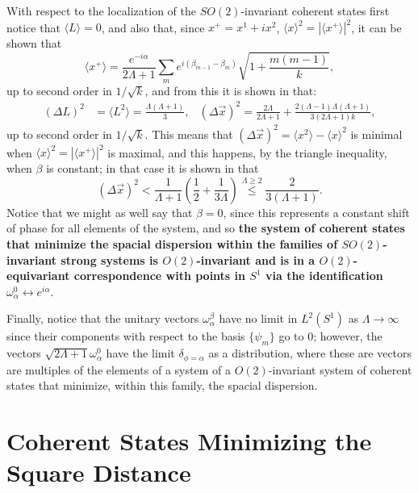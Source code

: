With respect to the localization of the $SO(2)$-invariant coherent states first notice that $\langle L \rangle = 0$, and also that, since $x^+ = x^1 + i x^2$, $\langle x\rangle ^2 = |\langle x^+ \rangle|^2$, it can be shown that 
\begin{equation*}
    \langle x^+ \rangle = \frac{e^{-i\alpha}}{2\Lambda + 1} \sum_{m} e^{i( \beta_{m-1} - \beta_m)} \sqrt{1 + \frac{m(m-1)}{k}},
\end{equation*} 
up to second order in $1/\sqrt{k}$, and from this it is shown in \cite{FioreCoherent2020} that:
\begin{align}\label{equationLocalizationAllStrongSystemsCoherentD2}
    (\Delta L)^2 &= \langle L^2 \rangle = \frac{\Lambda(\Lambda + 1)}{3},&
    (\Delta \vec x)^2 = \frac{2 \Lambda}{2 \Lambda + 1} + \frac{2(\Lambda - 1)\Lambda (\Lambda + 1)}{3(2\Lambda + 1)k},
\end{align}
up to second order in $1/\sqrt{k}$. This means that $(\Delta \vec x)^2 = \langle x^2 \rangle - \langle x \rangle ^2$ is minimal when $\langle x \rangle ^2 = |\langle x^+ \rangle |^2$ is maximal, and this happens, by the triangle inequality, when $\beta$ is constant; in that case it is shown in \cite{FioreCoherent2020} that
\begin{equation}
    (\Delta \vec x)^2 < \frac{1}{\Lambda + 1} \left( \frac{1}{2} + \frac{1}{3\Lambda} \right) \overset{\Lambda \geq 2}{\leq } \frac{2}{3(\Lambda + 1)}.
\end{equation}
Notice that we might as well say that $\beta = 0$, since this represents a constant shift of phase for all elements of the system, and so \textbf{the system of coherent states that minimize the spacial dispersion within the families of $SO(2)$-invariant strong systems is $O(2)$-invariant and is in a $O(2)$-equivariant correspondence with points in $S^1$ via the identification $\omega^0_\alpha \leftrightarrow e^{i \alpha}$}.

Finally, notice that the unitary vectors $\omega^\beta_\alpha$ have no limit in $L^2(S^1)$ as $\Lambda \to \infty$ since their components with respect to the basis $\{\psi_m\}$ go to $0$; however, the vectors $\sqrt{2\Lambda + 1}\omega^0_\alpha$ have the limit $\delta_{\phi = \alpha}$ as a distribution, where these are vectors are multiples of the elements of a system of a $O(2)$-invariant system of coherent states that minimize, within this family, the spacial dispersion.

\section{Coherent States Minimizing the Square Distance}

